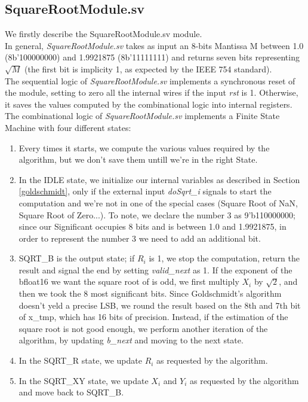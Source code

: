 \subsection{SquareRootModule.sv}
We firstly describe the SquareRootModule.sv module. \\
In general, \emph{SquareRootModule.sv} takes as input an 8-bits Mantissa M between 1.0 (8b'100000000) and 1.9921875 (8b'11111111) and returns seven bits representing $\sqrt{M}$ (the first bit is implicity 1, as expected by the IEEE 754 standard).\\
The sequential logic of \emph{SquareRootModule.sv} implements a synchronous reset of the module, setting to zero all the internal wires if the input \emph{rst} is 1. Otherwise, it saves the values computed by the combinational logic into internal registers.\\
The combinational logic of \emph{SquareRootModule.sv} implements a Finite State Machine with four different states:
\begin{enumerate}
\item Every times it starts, we compute the various values required by the algorithm, but we don't save them untill we're in the right State.
\item In the IDLE state, we initialize our internal variables as described in Section \ref{goldschmidt}, only if the external input \emph{doSqrt\_i} signals to start the computation and we're not in one of the special cases (Square Root of NaN, Square Root of Zero...). To note, we declare the number 3 as 9'b110000000; since our Significant occupies 8 bits and is between 1.0 and 1.9921875, in order to represent the number 3 we need to add an additional bit. 
\item SQRT\_B is the output state; if $R_i$ is 1, we stop the computation, return the result and signal the end by setting \emph{valid\_next} as 1. If the exponent of the bfloat16 we want the square root of is odd, we first multiply $X_i$ by $\sqrt{2}$, and then we took the 8 most significant bits. Since Goldschmidt's algorithm doesn't yeld a precise LSB, we round the result based on the 8th and 7th bit of x\_tmp, which has 16 bits of precision. Instead, if the estimation of the square root is not good enough, we perform another iteration of the algorithm, by updating \emph{b\_next} and moving to the next state.
\item In the SQRT\_R state, we update $R_i$ as requested by the algorithm.
\item In the SQRT\_XY state, we update $X_i$ and $Y_i$ as requested by the algorithm and move back to SQRT\_B.
\end{enumerate}

